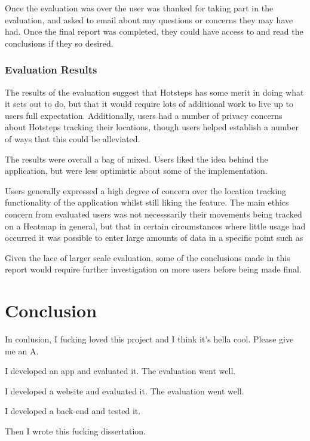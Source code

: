 \documentclass{l4proj}
\begin{document}
Once the evaluation was over the user was thanked for taking part in the evaluation, and asked to email about any questions or concerns they may have had. Once the final report was completed, they could have access to and read the conclusions if they so desired.

\subsection{Evaluation Results}

The results of the evaluation suggest that Hotsteps has some merit in doing what it sets out to do, but that it would require lots of additional work to live up to users full expectation. Additionally, users had a number of privacy concerns about Hotsteps tracking their locations, though users helped establish a number of ways that this could be alleviated.

The results were overall a bag of mixed. Users liked the idea behind the application, but were less optimistic about some of the implementation.

Users generally expressed a high degree of concern over the location tracking functionality of the application whilst still liking the feature. The main ethics concern from evaluated users was not necesssarily their movements being tracked on a Heatmap in general, but that in certain circumstances where little usage had occurred it was possible to enter large amounts of data in a specific point such as 

Given the lace of larger scale evaluation, some of the conclusions made in this report would require further investigation on more users before being made final.


\chapter{Conclusion}

In conlusion, I fucking loved this project and I think it's hella cool. Please give me an A.

I developed an app and evaluated it. The evaluation went well.

I developed a website and evaluated it. The evaluation went well.

I developed a back-end and tested it.

Then I wrote this fucking dissertation.
\end{document}
